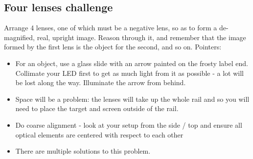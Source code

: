 \documentclass[a4paper]{report}
\begin{document}
    \subsection{Four lenses challenge}
	Arrange 4 lenses, one of which must be a negative lens, so as to form a de-magnified, real, upright image.
	Reason through it, and remember that the image formed by the first lens is the object for the second, and so on. Pointers:
	\begin{itemize}
    	\item For an object, use a glass slide with an arrow painted on the frosty label end. Collimate your LED first to get as much light from it as possible - a lot will be lost along the way. Illuminate the arrow from behind.
		\item Space will be a problem: the lenses will take up the whole rail and so you will need to place the target and screen outside of the rail.
		\item Do coarse alignment - look at your setup from the side / top and ensure all optical elements are centered with respect to each other
		\item There are multiple solutions to this problem.
	\end{itemize}
\end{document}
